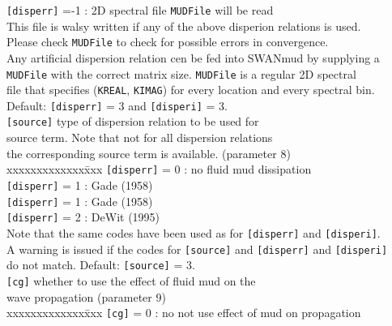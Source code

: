 \documentclass[12pt]{book}
\begin{document}
\begin{tabbing}
                   {\tt [disperr]} =-1 \>: 2D spectral file {\tt MUDFile} will be read \\
                   This file is walsy written if any of the above disperion relations is used.\\
                   Please check {\tt MUDFile} to check for possible errors in convergence.\\
                   Any artificial dispersion relation cen be fed into SWANmud by supplying a \\
                   {\tt MUDFile} with the correct matrix size. {\tt MUDFile} is a regular 2D spectral \\
                   file that specifies ({\tt KREAL}, {\tt KIMAG}) for every location and every spectral bin.\\
                   \poptabs
                   Default: {\tt [disperr]} = 3 and {\tt [disperi]} = 3. \-\\
{\tt [source]} \>  type of dispersion relation to be used for \+\\
                   source term. Note that not for all dispersion relations \\
                   the corresponding source term is available. (parameter 8) \\
                   \pushtabs
                   xxxxxxxxxxxxx\=xxx \kill
                   {\tt [disperr]} = 0 \>: no fluid mud dissipation\\
                   {\tt [disperr]} = 1 \>: Gade (1958)\\
                   {\tt [disperr]} = 1 \>: Gade (1958)\\
                   {\tt [disperr]} = 2 \>: DeWit (1995)\\
                   \poptabs 
                   Note that the same codes have been used as for {\tt [disperr]} and {\tt [disperi]}. \\
                   A warning is issued if the codes for {\tt [source]} and {\tt [disperr]} and {\tt [disperi]} \\
                   do not match.
                   Default: {\tt [source]} = 3.\-\\
{\tt [cg]}  \>     whether to use the effect of fluid mud on the \+\\
                   wave propagation (parameter 9)\\
                   \pushtabs
                   xxxxxxxxxxxxx\=xxx \kill
                   {\tt [cg]} = 0 \>: no not use effect of mud on propagation\\

\end{tabbing}
\end{document}
